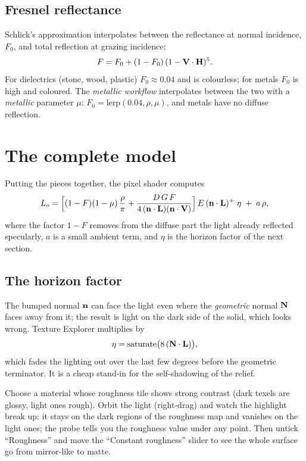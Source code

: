 \subsection{Fresnel reflectance}
Schlick's approximation \cite{schlick1994} interpolates between the reflectance at normal
incidence, $F_0$, and total reflection at grazing incidence:
\[
  F = F_0 + (1-F_0)\,(1-\mathbf{V}\cdot\mathbf{H})^5 .
\]
For dielectrics (stone, wood, plastic) $F_0\approx0.04$ and is colourless; for metals $F_0$ is
high and coloured. The \emph{metallic workflow} interpolates between the two with a
\emph{metallic} parameter $\mu$: $F_0 = \mathrm{lerp}(0.04, \rho, \mu)$, and metals have no
diffuse reflection.

\section{The complete model}
Putting the pieces together, the pixel shader computes
\[
  L_o = \Bigl[(1-F)(1-\mu)\,\frac{\rho}{\pi} + \frac{D\,G\,F}{4\,(\mathbf{n}\cdot\mathbf{L})(\mathbf{n}\cdot\mathbf{V})}\Bigr]
        \,E\,(\mathbf{n}\cdot\mathbf{L})^+\;\eta \;+\; a\,\rho,
\]
where the factor $1-F$ removes from the diffuse part the light already reflected specularly,
$a$ is a small ambient term, and $\eta$ is the horizon factor of the next section.

\subsection{The horizon factor}
\label{sec:horizon}
The bumped normal $\mathbf{n}$ can face the light even where the \emph{geometric} normal $\mathbf{N}$ faces
away from it; the result is light on the dark side of the solid, which looks wrong. Texture
Explorer multiplies by
\[
  \eta = \operatorname{saturate}\bigl(8\,(\mathbf{N}\cdot\mathbf{L})\bigr),
\]
which fades the lighting out over the last few degrees before the geometric terminator. It is
a cheap stand-in for the self-shadowing of the relief.

\begin{tryit}
Choose a material whose roughness tile shows strong contrast (dark texels are glossy,
light ones rough). Orbit the light (right-drag) and watch the highlight break up: it stays on
the dark regions of the roughness map and vanishes on the light ones; the probe tells you the
roughness value under any point. Then untick ``Roughness'' and move the ``Constant roughness'' slider to
see the whole surface go from mirror-like to matte.
\end{tryit}
